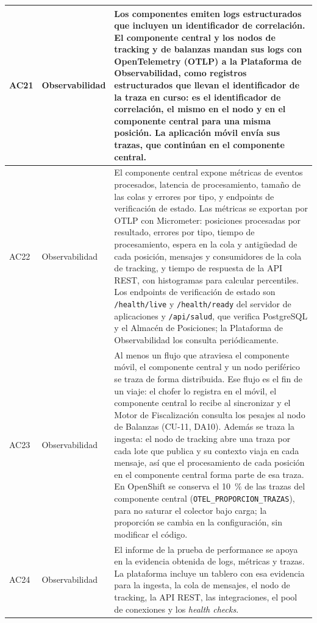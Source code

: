 \begin{longtable}{|p{1.3cm}|p{2.7cm}|p{11.5cm}|}
    \hline
    AC21 & Observabilidad & Los componentes emiten logs estructurados que incluyen un identificador de correlación. El componente central y los nodos de tracking y de balanzas mandan sus logs con OpenTelemetry (OTLP) a la Plataforma de Observabilidad, como registros estructurados que llevan el identificador de la traza en curso: es el identificador de correlación, el mismo en el nodo y en el componente central para una misma posición. La aplicación móvil envía sus trazas, que continúan en el componente central. \\
    \hline
    AC22 & Observabilidad & El componente central expone métricas de eventos procesados, latencia de procesamiento, tamaño de las colas y errores por tipo, y endpoints de verificación de estado. Las métricas se exportan por OTLP con Micrometer: posiciones procesadas por resultado, errores por tipo, tiempo de procesamiento, espera en la cola y antigüedad de cada posición, mensajes y consumidores de la cola de tracking, y tiempo de respuesta de la API REST, con histogramas para calcular percentiles. Los endpoints de verificación de estado son \texttt{/health/live} y \texttt{/health/ready} del servidor de aplicaciones y \texttt{/api/salud}, que verifica PostgreSQL y el Almacén de Posiciones; la Plataforma de Observabilidad los consulta periódicamente. \\
    \hline
    AC23 & Observabilidad & Al menos un flujo que atraviesa el componente móvil, el componente central y un nodo periférico se traza de forma distribuida. Ese flujo es el fin de un viaje: el chofer lo registra en el móvil, el componente central lo recibe al sincronizar y el Motor de Fiscalización consulta los pesajes al nodo de Balanzas (CU-11, DA10). Además se traza la ingesta: el nodo de tracking abre una traza por cada lote que publica y su contexto viaja en cada mensaje, así que el procesamiento de cada posición en el componente central forma parte de esa traza. En OpenShift se conserva el 10~\% de las trazas del componente central (\texttt{OTEL\_PROPORCION\_TRAZAS}), para no saturar el colector bajo carga; la proporción se cambia en la configuración, sin modificar el código. \\
    \hline
    AC24 & Observabilidad & El informe de la prueba de performance se apoya en la evidencia obtenida de logs, métricas y trazas. La plataforma incluye un tablero con esa evidencia para la ingesta, la cola de mensajes, el nodo de tracking, la API REST, las integraciones, el pool de conexiones y los \emph{health checks}. \\

\end{longtable}
